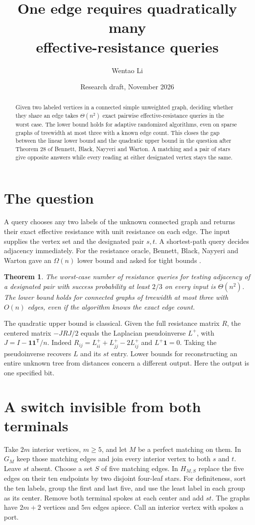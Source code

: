 \documentclass[11pt]{article}
\title{One edge requires quadratically many\protect\\ effective-resistance queries}
\author{Wentao Li}
\date{Research draft, November 2026}
\newtheorem{theorem}{Theorem}
\begin{document}
\maketitle
\begin{abstract}
Given two labeled vertices in a connected simple unweighted graph, deciding whether they share an edge takes $\Theta(n^2)$ exact pairwise effective-resistance queries in the worst case. The lower bound holds for adaptive randomized algorithms, even on sparse graphs of treewidth at most three with a known edge count. This closes the gap between the linear lower bound and the quadratic upper bound in the question after Theorem 28 of Bennett, Black, Nayyeri and Warton. A matching and a pair of stars give opposite answers while every reading at either designated vertex stays the same.
\end{abstract}

\section{The question}
A query chooses any two labels of the unknown connected graph and returns their exact effective resistance with unit resistance on each edge. The input supplies the vertex set and the designated pair $s,t$. A shortest-path query decides adjacency immediately. For the resistance oracle, Bennett, Black, Nayyeri and Warton gave an $\Omega(n)$ lower bound and asked for tight bounds \cite[Section 5, following Theorem 28]{bbnw}.

\begin{theorem}\label{main}
The worst-case number of resistance queries for testing adjacency of a designated pair with success probability at least $2/3$ on every input is $\Theta(n^2)$. The lower bound holds for connected graphs of treewidth at most three with $O(n)$ edges, even if the algorithm knows the exact edge count.
\end{theorem}

The quadratic upper bound is classical. Given the full resistance matrix $R$, the centered matrix $-JRJ/2$ equals the Laplacian pseudoinverse $L^+$, with $J=I-\mathbf{1}\mathbf{1}^{\mathsf T}/n$. Indeed $R_{ij}=L^+_{ii}+L^+_{jj}-2L^+_{ij}$ and $L^+\mathbf{1}=0$. Taking the pseudoinverse recovers $L$ and its $st$ entry. Lower bounds for reconstructing an entire unknown tree from distances \cite{rs} concern a different output. Here the output is one specified bit.

\section{A switch invisible from both terminals}
Take $2m$ interior vertices, $m\ge5$, and let $M$ be a perfect matching on them. In $G_M$ keep those matching edges and join every interior vertex to both $s$ and $t$. Leave $st$ absent. Choose a set $S$ of five matching edges. In $H_{M,S}$ replace the five edges on their ten endpoints by two disjoint four-leaf stars. For definiteness, sort the ten labels, group the first and last five, and use the least label in each group as its center. Remove both terminal spokes at each center and add $st$. The graphs have $2m+2$ vertices and $5m$ edges apiece. Call an interior vertex with spokes a port.
\end{document}
